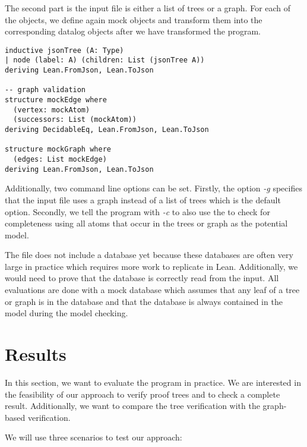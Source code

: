 The second part is the input file is either a list of trees or a graph. For each of the objects, we define again mock objects and transform them into the corresponding datalog objects after we have transformed the program.

\begin{lstlisting}
inductive jsonTree (A: Type)
| node (label: A) (children: List (jsonTree A))
deriving Lean.FromJson, Lean.ToJson

-- graph validation
structure mockEdge where
  (vertex: mockAtom)
  (successors: List (mockAtom))
deriving DecidableEq, Lean.FromJson, Lean.ToJson

structure mockGraph where
  (edges: List mockEdge)
deriving Lean.FromJson, Lean.ToJson
\end{lstlisting}

Additionally, two command line options can be set. Firstly, the option \textit{-g} specifies that the input file uses a graph instead of a list of trees which is the default option. Secondly, we tell the program with \textit{-c} to also use the \modelChecker to check for completeness using all atoms that occur in the trees or graph as the potential model.

The file does not include a database yet because these databases are often very large in practice which requires more work to replicate in Lean. Additionally, we would need to prove that the database is correctly read from the input. All evaluations are done with a mock database which assumes that any leaf of a tree or graph is in the database and that the database is always contained in the model during the model checking.


\section{Results}

In this section, we want to evaluate the program in practice. We are interested in the feasibility of our approach to verify proof trees and to check a complete result. Additionally, we want to compare the tree verification with the graph-based verification.

We will use three scenarios to test our approach:

